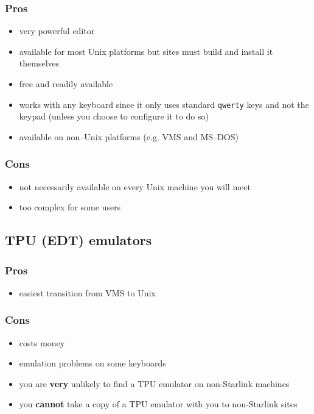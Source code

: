 \subsubsection*{Pros}

\begin{itemize}
\item very powerful editor
\item available for most Unix platforms but sites must build and 
install it themselves
\item free and readily available
\item works with any keyboard since it only uses standard {\tt qwerty} keys
and not the keypad (unless you choose to configure it to do so)
\item available on non--Unix platforms (e.g. VMS and MS--DOS)
\end{itemize}

\subsubsection*{Cons}
\begin{itemize}
\item not necessarily available on every Unix machine you will meet
\item too complex for some users
\end{itemize}

\subsection{TPU (EDT) emulators}

\subsubsection*{Pros}

\begin{itemize}
\item easiest transition from VMS to Unix
\end{itemize}

\subsubsection*{Cons}

\begin{itemize}
\item costs money
\item emulation problems on some keyboards
\item you are {\bf very} unlikely to find a TPU emulator on non-Starlink machines
\item you {\bf cannot} take a copy of a TPU emulator with you to non-Starlink sites
\end{itemize}

